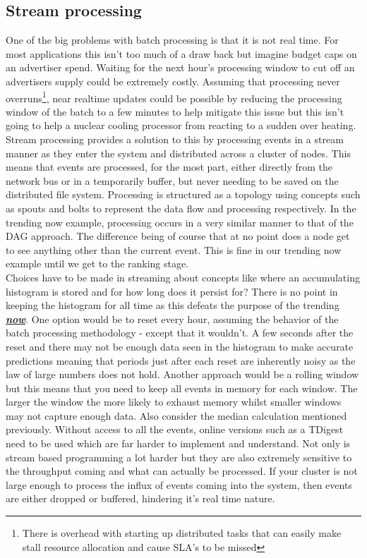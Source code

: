 \documentclass[a4paper,11pt]{scrreprt}
\begin{document}
\subsection{Stream processing}
One of the big problems with batch processing is that it is not real time. For most applications this isn't too much of a draw back but imagine budget caps on an advertiser spend. Waiting for the next hour's processing window to cut off an advertisers supply could be extremely costly. Assuming that processing never overruns\footnote{There is overhead with starting up distributed tasks that can easily make stall resource allocation and cause SLA's to be missed}, near realtime updates could be possible by reducing the processing window of the batch to a few minutes to help mitigate this issue but this isn't going to help a nuclear cooling processor from reacting to a sudden over heating. Stream processing provides a solution to this by processing events in a stream manner as they enter the system and distributed across a cluster of nodes. This means that events are processed, for the most part, either directly from the network bus or in a temporarily buffer, but never needing to be saved on the distributed file system. Processing is structured as a topology using concepts such as spouts and bolts to represent the data flow and processing respectively. In the trending now example, processing occurs in a very similar manner to that of the DAG approach. The difference being of course that at no point does a node get to see anything other than the current event. This is fine in our trending now example until we get to the ranking stage. \\

Choices have to be made in streaming about concepts like where an accumulating histogram is stored and for how long does it persist for? There is no point in keeping the histogram for all time as this defeats the purpose of the trending \textbf{\textit{\underline{now}}}. One option would be to reset every hour, assuming the behavior of the batch processing methodology - except that it wouldn't. A few seconds after the reset and there may not be enough data seen in the histogram to make accurate predictions meaning that periods just after each reset are inherently noisy as the law of large numbers does not hold. Another approach would be a rolling window but this means that you need to keep all events in memory for each window. The larger the window the more likely to exhaust memory whilst smaller windows may not capture enough data. Also consider the median calculation mentioned previously. Without access to all the events, online versions such as a TDigest\cite{tdigest} need to be used which are far harder to implement and understand. Not only is stream based programming a lot harder but they are also extremely sensitive to the throughput coming and what can actually be processed. If your cluster is not large enough to process the influx of events coming into the system, then events are either dropped or buffered, hindering it's real time nature.\\
\end{document}
